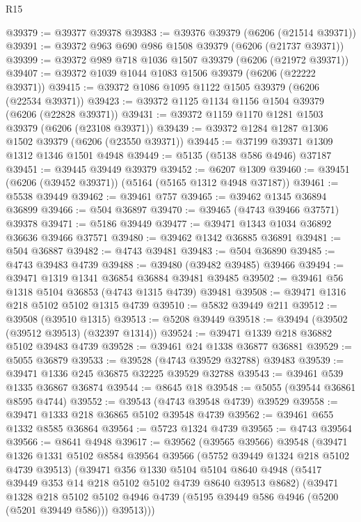 \begin{lexlean}{R15}
\begin{coremodule}
{{{{{{{{{{{@39379 := @39377 @39378
@39383 := @39376 @39379 (@6206 (@21514 @39371))
@39391 := @39372 @963 @690 @986 @1508 @39379 (@6206 (@21737 @39371))
@39399 := @39372 @989 @718 @1036 @1507 @39379 (@6206 (@21972 @39371))
@39407 := @39372 @1039 @1044 @1083 @1506 @39379 (@6206 (@22222 @39371))
@39415 := @39372 @1086 @1095 @1122 @1505 @39379 (@6206 (@22534 @39371))
@39423 := @39372 @1125 @1134 @1156 @1504 @39379 (@6206 (@22828 @39371))
@39431 := @39372 @1159 @1170 @1281 @1503 @39379 (@6206 (@23108 @39371))
@39439 := @39372 @1284 @1287 @1306 @1502 @39379 (@6206 (@23550 @39371))
@39445 := @37199 @39371 @1309 @1312 @1346 @1501 @4948
@39449 := @5135 (@5138 @586 @4946) @37187
@39451 := @39445 @39449 @39379
@39452 := @6207 @1309
@39460 := @39451 (@6206 (@39452 @39371)) (@5164 (@5165 @1312 @4948 @37187))
@39461 := @5538 @39449
@39462 := @39461 @757
@39465 := @39462 @1345 @36894 @36899
@39466 := @504 @36897
@39470 := @39465 (@4743 @39466 @37571) @39378
@39471 := @5186 @39449
@39477 := @39471 @1343 @1034 @36892 @36636 @39466 @37571
@39480 := @39462 @1342 @36885 @36891
@39481 := @504 @36887
@39482 := @4743 @39481
@39483 := @504 @36890
@39485 := @4743 @39483 @4739
@39488 := @39480 (@39482 @39485) @39466
@39494 := @39471 @1319 @1341 @36854 @36884 @39481 @39485
@39502 := @39461 @56 @1318 @5104 @36853 (@4743 @1315 @4739) @39481
@39508 := @39471 @1316 @218 @5102 @5102 @1315 @4739
@39510 := @5832 @39449 @211
@39512 := @39508 (@39510 @1315)
@39513 := @5208 @39449
@39518 := @39494 (@39502 (@39512 @39513) (@32397 @1314))
@39524 := @39471 @1339 @218 @36882 @5102 @39483 @4739
@39528 := @39461 @24 @1338 @36877 @36881
@39529 := @5055 @36879
@39533 := @39528 (@4743 @39529 @32788) @39483
@39539 := @39471 @1336 @245 @36875 @32225 @39529 @32788
@39543 := @39461 @539 @1335 @36867 @36874
@39544 := @8645 @18
@39548 := @5055 (@39544 @36861 @8595 @4744)
@39552 := @39543 (@4743 @39548 @4739) @39529
@39558 := @39471 @1333 @218 @36865 @5102 @39548 @4739
@39562 := @39461 @655 @1332 @8585 @36864
@39564 := @5723 @1324 @4739
@39565 := @4743 @39564
@39566 := @8641 @4948
@39617 := @39562
    (@39565 @39566)
    @39548
    (@39471
      @1326
      @1331
      @5102
      @8584
      @39564
      @39566
      (@5752 @39449 @1324 @218 @5102 @4739 @39513)
      (@39471
        @356
        @1330
        @5104
        @5104
        @8640
        @4948
        (@5417 @39449 @353 @14 @218 @5102 @5102 @4739 @8640 @39513 @8682)
        (@39471
          @1328
          @218
          @5102
          @5102
          @4946
          @4739
          (@5195 @39449 @586 @4946 (@5200 (@5201 @39449 @586)))
          @39513)))
}}}}}}}}}}}
\end{coremodule}
\end{lexlean}

